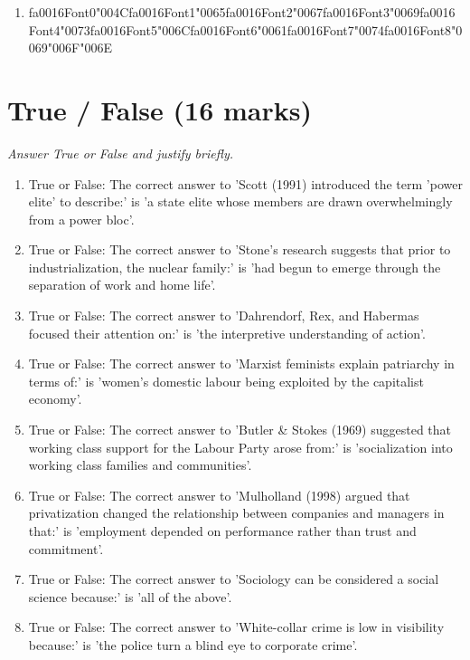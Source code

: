 \documentclass[12pt]{article}
\begin{document}
\begin{enumerate}[label=\arabic*.]
\begin{enumerate}[label=(\alph*)]
    \item {\csname fa0016Font0\endcsname\char"004C}{\csname fa0016Font1\endcsname\char"0065}{\csname fa0016Font2\endcsname\char"0067}{\csname fa0016Font3\endcsname\char"0069}{\csname fa0016Font4\endcsname\char"0073}{\csname fa0016Font5\endcsname\char"006C}{\csname fa0016Font6\endcsname\char"0061}{\csname fa0016Font7\endcsname\char"0074}{\csname fa0016Font8\endcsname\char"0069}{\char"006F}{\char"006E}
\end{enumerate}
\end{enumerate}

\section*{True / False (16 marks)}
\textit{Answer True or False and justify briefly.}
\begin{enumerate}[label=\arabic*.]
\item True or False: The correct answer to 'Scott (1991) introduced the term 'power elite' to describe:' is 'a state elite whose members are drawn overwhelmingly from a power bloc'.
\item True or False: The correct answer to 'Stone's research suggests that prior to industrialization, the nuclear family:' is 'had begun to emerge through the separation of work and home life'.
\item True or False: The correct answer to 'Dahrendorf, Rex, and Habermas focused their attention on:' is 'the interpretive understanding of action'.
\item True or False: The correct answer to 'Marxist feminists explain patriarchy in terms of:' is 'women's domestic labour being exploited by the capitalist economy'.
\item True or False: The correct answer to 'Butler \& Stokes (1969) suggested that working class support for the Labour Party arose from:' is 'socialization into working class families and communities'.
\item True or False: The correct answer to 'Mulholland (1998) argued that privatization changed the relationship between companies and managers in that:' is 'employment depended on performance rather than trust and commitment'.
\item True or False: The correct answer to 'Sociology can be considered a social science because:' is 'all of the above'.
\item True or False: The correct answer to 'White-collar crime is low in visibility because:' is 'the police turn a blind eye to corporate crime'.
\end{enumerate}
\end{document}
